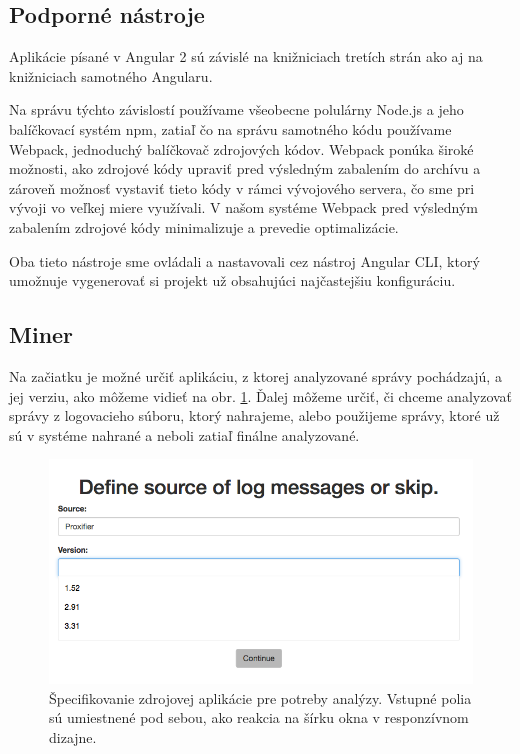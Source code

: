 \subsection{Podporné nástroje}
Aplikácie písané v Angular 2 sú závislé na knižniciach tretích strán ako aj na knižniciach samotného Angularu.
\par Na správu týchto závislostí používame všeobecne polulárny Node.js a jeho balíčkovací systém npm, zatiaľ čo na správu samotného kódu používame Webpack, jednoduchý balíčkovač zdrojových kódov. Webpack ponúka široké možnosti, ako zdrojové kódy upraviť pred výsledným zabalením do archívu a zároveň možnosť vystaviť tieto kódy v rámci vývojového servera, čo sme pri vývoji vo veľkej miere využívali. V našom systéme Webpack pred výsledným zabalením zdrojové kódy minimalizuje a prevedie optimalizácie.
\par Oba tieto nástroje sme ovládali a nastavovali cez nástroj Angular CLI, ktorý umožnuje vygenerovať si projekt už obsahujúci najčastejšiu konfiguráciu.


\subsection{Miner}
Na začiatku je možné určiť aplikáciu, z ktorej analyzované správy pochádzajú, a jej verziu, ako môžeme vidieť na obr. \ref{fig:miner-source}. Ďalej môžeme určiť, či chceme analyzovať správy z logovacieho súboru, ktorý nahrajeme, alebo použijeme správy, ktoré už sú v systéme nahrané a neboli zatiaľ finálne analyzované.

\begin{figure}[htbp]
 \centering 
 \begin{minipage}{0.95\linewidth}
 	\centering
 	\includegraphics[width=\textwidth]{Images/thesis-miner-source.png}
 \end{minipage}
  \caption{Špecifikovanie zdrojovej aplikácie pre potreby analýzy. Vstupné polia sú umiestnené pod sebou, ako reakcia na šírku okna v responzívnom dizajne.}
  \label{fig:miner-source}
\end{figure}

